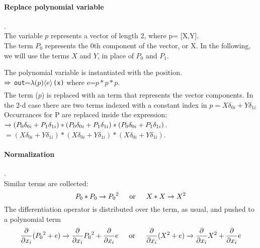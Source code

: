 \paragraph{Replace polynomial variable}.\\
The variable $p$ represents a vector of length 2, where p= [X,Y].\\
The term $P_0$ represents the 0th component of the vector, or X.
In the following, we will use the terms $X$ and $Y$, in place of $P_0$ and $P_1$.


The polynomial variable is instantiated with the position.\\
$\xRightarrow[]{} $ \lstinline[mathescape=true]!out!=$\lambda(p) {\left\langle{e}\right\rangle}_{}$\lstinline[mathescape=true]!(x)! where e=$p*p*p$.\\
The \name{} term ($p$) is replaced with an \name{} term that represents the vector components.
 In the 2-d case there are two terms indexed with a constant index in 
$p = X \delta_{0i}+Y \delta_{1i}$\\


Occurrances for P are replaced inside the expression:\\ 
$\xrightarrow[]{} (P_0 \delta_{0i}+P_1 \delta_{1i})*(P_0 \delta_{0i}+P_1 \delta_{1i})*(P_0 \delta_{0i}+P_1 \delta_{1i})$.\\
$= (X \delta_{0i}+Y \delta_{1i})*(X \delta_{0i}+Y \delta_{1i})*(X \delta_{0i}+Y\delta_{1i})$.\\




\paragraph{Normalization}.\\
Similar terms are collected:\\
$$P_0*P_0\rewriteEINEXP \expPolyTerm{P_0}{2} \indent \text{or}\indent X*X\rewriteEINEXP \expPolyTerm{X}{2} $$ 
The differentiation operator is distributed over the \name{} term, as usual,  and pushed to a polynomial term\\
 $$\frac{\partial}{\partial x_i} (\expPolyTerm{P_0}{2}+e) \rewriteEINEXP \expPolyTermD{P_0}{2}{i} + \frac{\partial}{\partial x_i}  e
 \indent \text{or}\indent
 \frac{\partial}{\partial x_i} (\expPolyTerm{X}{2}+e) \rewriteEINEXP \expPolyTermD{X}{2}{i} +\frac{\partial}{\partial x_i}  e
 $$


